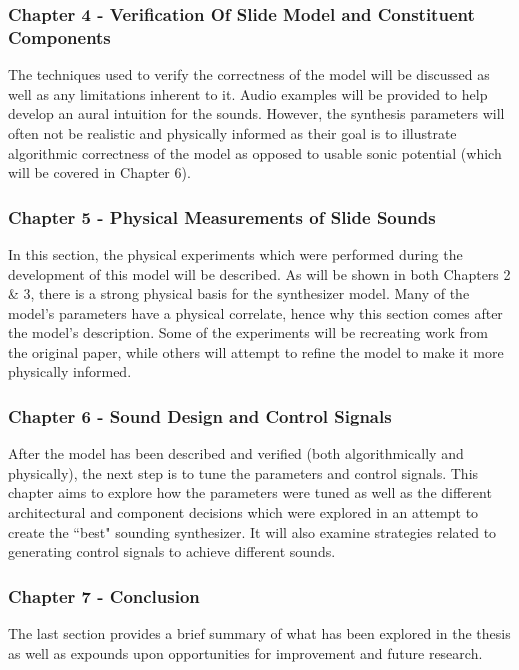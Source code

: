 \documentclass[../main.tex]{subfiles}
\begin{document}
\subsubsection{Chapter 4 - Verification Of Slide Model and Constituent Components}
The techniques used to verify the correctness of the model will be discussed as well as any limitations inherent to it. Audio examples will be provided to help develop an aural intuition for the sounds. However, the synthesis parameters will often not be realistic and physically informed as their goal is to illustrate algorithmic correctness of the model as opposed to usable sonic potential (which will be covered in Chapter 6).

\subsubsection{Chapter 5 - Physical Measurements of Slide Sounds}
In this section, the physical experiments which were performed during the development of this model will be described. As will be shown in both Chapters 2 \& 3, there is a strong physical basis for the synthesizer model. Many of the model's parameters have a physical correlate, hence why this section comes after the model's description. Some of the experiments will be recreating work from the original paper, while others will attempt to refine the model to make it more physically informed.

\subsubsection{Chapter 6 - Sound Design and Control Signals}
After the model has been described and verified (both algorithmically and physically), the next step is to tune the parameters and control signals. This chapter aims to explore how the parameters were tuned as well as the different architectural and component decisions which were explored in an attempt to create the ``best" sounding synthesizer. It will also examine strategies related to generating control signals to achieve different sounds.

\subsubsection{Chapter 7 - Conclusion}
The last section provides a brief summary of what has been explored in the thesis as well as expounds upon opportunities for improvement and future research.
\end{document}
